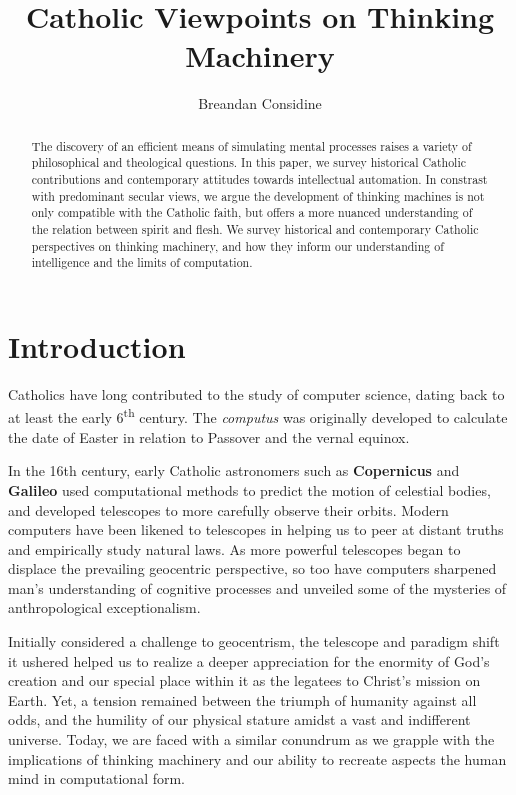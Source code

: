 \documentclass[sigplan,nonacm]{acmart}\settopmatter{printfolios=false,printccs=false,printacmref=false}
\begin{document}
  \title{Catholic Viewpoints on Thinking Machinery}
  \begin{abstract}
  The discovery of an efficient means of simulating mental processes raises a variety of philosophical and theological questions. In this paper, we survey historical Catholic contributions and contemporary attitudes towards intellectual automation. In constrast with predominant secular views, we argue the development of thinking machines is not only compatible with the Catholic faith, but offers a more nuanced understanding of the relation between spirit and flesh. We survey historical and contemporary Catholic perspectives on thinking machinery, and how they inform our understanding of intelligence and the limits of computation.
  \end{abstract}

  \author{Breandan Considine}

  \maketitle

  \section{Introduction}

  Catholics have long contributed to the study of computer science, dating back to at least the early 6\textsuperscript{th} century. The \textit{computus} was originally developed to calculate the date of Easter in relation to Passover and the vernal equinox.

  In the 16th century, early Catholic astronomers such as \textbf{Copernicus} and \textbf{Galileo} used computational methods to predict the motion of celestial bodies, and developed telescopes to more carefully observe their orbits. Modern computers have been likened to telescopes in helping us to peer at distant truths and empirically study natural laws. As more powerful telescopes began to displace the prevailing geocentric perspective, so too have computers sharpened man's understanding of cognitive processes and unveiled some of the mysteries of anthropological exceptionalism.

  Initially considered a challenge to geocentrism, the telescope and paradigm shift it ushered helped us to realize a deeper appreciation for the enormity of God's creation and our special place within it as the legatees to Christ's mission on Earth. Yet, a tension remained between the triumph of humanity against all odds, and the humility of our physical stature amidst a vast and indifferent universe. Today, we are faced with a similar conundrum as we grapple with the implications of thinking machinery and our ability to recreate aspects the human mind in computational form.
\end{document}
